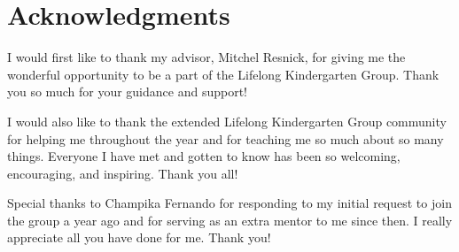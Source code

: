 

\cleardoublepage
\setcounter{savepage}{\thepage}
\begin{abstractpage}

\end{abstractpage}

% 

\cleardoublepage

\section*{Acknowledgments}

I would first like to thank my advisor, Mitchel Resnick, for giving me the wonderful opportunity to be a part of the Lifelong Kindergarten Group. Thank you so much for your guidance and support!

I would also like to thank the extended Lifelong Kindergarten Group community for helping me throughout the year and for teaching me so much about so many things. Everyone I have met and gotten to know has been so welcoming, encouraging, and inspiring. Thank you all!

Special thanks to Champika Fernando for responding to my initial request to join the group a year ago and for serving as an extra mentor to me since then. I really appreciate all you have done for me. Thank you!


